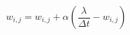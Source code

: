 \documentclass{article}
\begin{document}
\[ w_{i,j} = w_{i,j} + \alpha\left(\frac{\lambda}{\Delta t} - w_{i,j} \right) \]
\pagebreak
\end{document}
